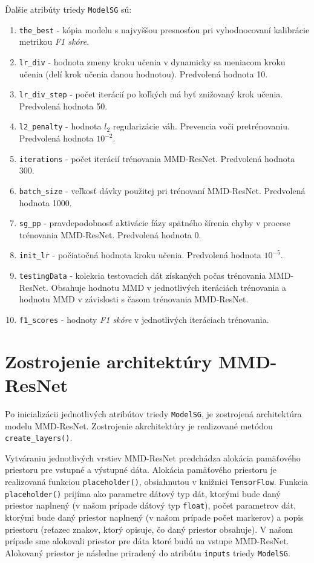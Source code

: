Ďalšie atribúty triedy \texttt{ModelSG} sú:
\begin{enumerate}
    \item \texttt{the_best} - kópia modelu s najvyššou presnosťou pri vyhodnocovaní kalibrácie metrikou \textit{F1 skóre}.
    \item \texttt{lr_div} - hodnota zmeny kroku učenia v dynamicky sa meniacom kroku učenia (delí krok učenia danou hodnotou). Predvolená hodnota 10.
    \item \texttt{lr_div_step} - počet iterácií po koľkých má byť znižovaný krok učenia. Predvolená hodnota 50.
    \item \texttt{l2_penalty} - hodnota $l_2$ regularizácie váh. Prevencia voči pretrénovaniu. Predvolená hodnota $10^{-2}$.
    \item \texttt{iterations} - počet iterácií trénovania MMD-ResNet. Predvolená hodnota 300.
    \item \texttt{batch_size} - veľkosť dávky použitej pri trénovaní MMD-ResNet. Predvolená hodnota 1000.
    \item \texttt{sg_pp} - pravdepodobnosť aktivácie fázy spätného šírenia chyby v procese trénovania MMD-ResNet. Predvolená hodnota 0.
    \item \texttt{init_lr} - počiatočná hodnota kroku učenia. Predvolená hodnota $10^{-5}$.
    \item \texttt{testingData} - kolekcia testovacích dát získaných počas trénovania MMD-ResNet. Obsahuje hodnotu MMD v jednotlivých iteráciách trénovania a hodnotu MMD v závislosti s časom trénovania MMD-ResNet.
    \item \texttt{f1_scores} - hodnoty \textit{F1 skóre} v jednotlivých iteráciach trénovania.
\end{enumerate}

\section{Zostrojenie architektúry MMD-ResNet}

Po inicializácii jednotlivých atribútov triedy \texttt{ModelSG}, je zostrojená architektúra modelu MMD-ResNet. Zostrojenie akrchitektúry je realizované metódou \texttt{create_layers()}. 

Vytváraniu jednotlivých vrstiev MMD-ResNet predchádza alokácia pamäťového priestoru pre vstupné a výstupné dáta. Alokácia pamäťového priestoru je realizovaná funkciou \texttt{placeholder()}, obsiahnutou v knižnici \texttt{TensorFlow}. Funkcia \texttt{placeholder()} prijíma ako parametre dátový typ dát, ktorými bude daný priestor naplnený (v našom prípade dátový typ \texttt{float}), počet parametrov dát, ktorými bude daný priestor naplnený (v našom prípade počet markerov) a popis priestoru (reťazec znakov, ktorý opisuje, čo daný priestor obsahuje). V našom prípade sme alokovali priestor pre dáta ktoré budú na vstupe MMD-ResNet. Alokovaný priestor je následne priradený do atribútu \texttt{inputs} triedy \texttt{ModelSG}.

